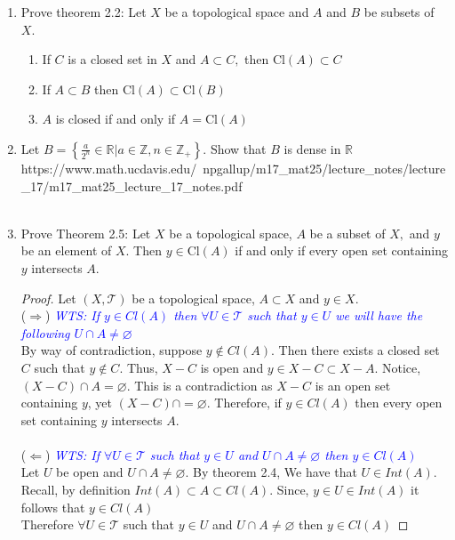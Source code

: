 \documentclass[12pt]{article}
\newcommand{\TT}{\mathcal{T}}
\newcommand{\wts}[1]{\textit{\textcolor{blue}{WTS: #1}}\\}
\newcommand{\pp}{\textit{\textcolor{yellow}{PP: }}}%
\begin{document}
\begin{enumerate}
		\item[\pp2.02] Prove theorem 2.2: Let $ X $ be a topological space and $ A $ and $ B $ be subsets of $ X $.
		\begin{enumerate}
			\item[(a)]If $C$ is a closed set in $X$ and $A \subset C ,$ then $\mathrm { Cl } ( A ) \subset C$\\
			
			\item[(b)] If $A \subset B$ then $\mathrm { Cl } ( A ) \subset \mathrm { Cl } ( B )$\\
			
			\item[(c)] $A$ is closed if and only if $A = \mathrm { Cl } ( A )$\\
			
		\end{enumerate}
		
		\item[\pp2.07] Let $B=\left\{\frac{a}{2^{n}} \in \mathbb{R} | a \in \mathbb{Z}, n \in \mathbb{Z}_{+}\right\} .$ Show that $B$ is dense in $\mathbb{R}$\\
		https://www.math.ucdavis.edu/~npgallup/m17_mat25/lecture_notes/lecture_17/m17_mat25_lecture_17_notes.pdf\\
		\\
		
		\item[2.10] Prove Theorem 2.5: Let $X$ be a topological space, $A$ be a subset of $X,$ and $y$ be an element of $X .$ Then $y \in \mathrm{Cl}(A)$ if and only if every open set containing $y$ intersects $A$.
		\begin{proof}
			Let $ (X,\TT) $ be a topological space, $ A\subset X $ and $ y\in X $.\\
			($ \Rightarrow $) \wts{If $ y\in Cl(A) $ then $ \forall U \in \TT $ such that $ y\in U $ we will have the following $ U\cap A \not= \varnothing $}
			By way of contradiction, suppose $ y\not\in Cl(A) $. Then there exists a closed set $ C $ such that $ y\not\in C$. Thus, $ X-C $ is open and $ y\in X-C \subset X-A $. Notice, $ (X-C)\cap A = \varnothing $. This is a contradiction as $ X-C $ is an open set containing $ y $, yet $ (X-C)\cap = \varnothing $. 
			Therefore, if $ y\in Cl(A) $ then every open set containing $y$ intersects $A$.\\
			\\
			($\Leftarrow$) \wts{If $ \forall U \in \TT  $ such that $ y\in U $ and $ U\cap A \not= \varnothing $ then $ y\in Cl(A) $}
			Let $U$ be open and $ U\cap A \not= \varnothing $. By theorem 2.4, We have that $ U \in Int(A) $. Recall, by definition $ Int(A) \subset A \subset Cl(A) $. Since, $ y\in U \in Int(A) $ it follows that $ y\in Cl(A) $\\
			Therefore $ \forall U \in \TT  $ such that $ y\in U $ and $ U\cap A \not= \varnothing $ then $ y\in Cl(A) $
		\end{proof}
		

\end{enumerate}
\end{document}
